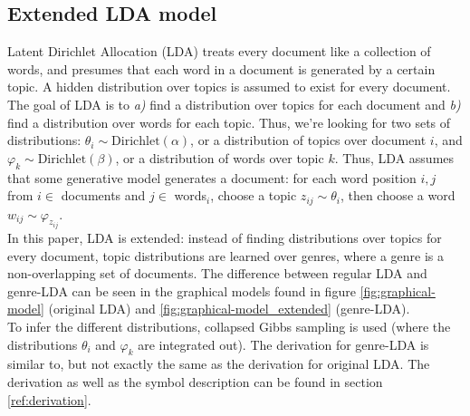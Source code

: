 \subsection{Extended LDA model}\label{sub:ext-lda}
Latent Dirichlet Allocation (LDA) treats every document like a collection of words, and presumes that each word in a document is generated by a certain topic. A hidden distribution over topics is assumed to exist for every document. The goal of LDA is to \textit{a)} find a distribution over topics for each document and \textit{b)} find a distribution over words for each topic. Thus, we're looking for two sets of distributions: $\theta_i \sim \text{Dirichlet}(\alpha)$, or a distribution of topics over document $i$, and $\varphi_k \sim \text{Dirichlet}(\beta)$, or a distribution of words over topic $k$. Thus, LDA assumes that some generative model generates a document: for each word position $i,j$ from $i \in$ documents and $j \in$ words$_i$, choose a topic $z_{ij} \sim \theta_i$, then choose a word $w_{ij} \sim \varphi_{z_{ij}}$. \\
In this paper, LDA is extended: instead of finding distributions over topics for every document, topic distributions are learned over genres, where a genre is a non-overlapping set of documents. The difference between regular LDA and genre-LDA can be seen in the graphical models found in figure \ref{fig:graphical-model} (original LDA) and \ref{fig:graphical-model_extended} (genre-LDA). \\
To infer the different distributions, collapsed Gibbs sampling is used (where the distributions $\theta_i$ and $\varphi_k$ are integrated out). The derivation for genre-LDA is similar to, but not exactly the same as the derivation for original LDA. The derivation as well as the symbol description can be found in section \ref{ref:derivation}.\\

